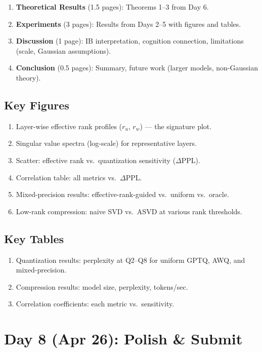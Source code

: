 \documentclass[11pt,a4paper]{article}
\begin{document}
\begin{enumerate}
    \item \textbf{Theoretical Results} (1.5 pages): Theorems 1--3 from Day 6.

    \item \textbf{Experiments} (3 pages): Results from Days 2--5 with figures and tables.

    \item \textbf{Discussion} (1 page): IB interpretation, cognition connection, limitations (scale, Gaussian assumptions).

    \item \textbf{Conclusion} (0.5 pages): Summary, future work (larger models, non-Gaussian theory).
\end{enumerate}

\subsection{Key Figures}
\begin{enumerate}
    \item Layer-wise effective rank profiles ($r_u$, $r_w$) --- the signature plot.
    \item Singular value spectra (log-scale) for representative layers.
    \item Scatter: effective rank vs.\ quantization sensitivity ($\Delta$PPL).
    \item Correlation table: all metrics vs.\ $\Delta$PPL.
    \item Mixed-precision results: effective-rank-guided vs.\ uniform vs.\ oracle.
    \item Low-rank compression: naive SVD vs.\ ASVD at various rank thresholds.
\end{enumerate}

\subsection{Key Tables}
\begin{enumerate}
    \item Quantization results: perplexity at Q2--Q8 for uniform GPTQ, AWQ, and mixed-precision.
    \item Compression results: model size, perplexity, tokens/sec.
    \item Correlation coefficients: each metric vs.\ sensitivity.
\end{enumerate}

\section{Day 8 (Apr 26): Polish \& Submit}
\end{document}
